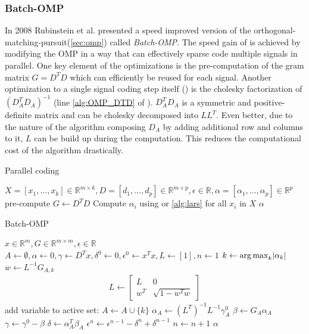 \subsubsection{Batch-OMP}
In 2008 Rubinstein et al.\cite{Rubinstein2008} presented a speed improved
version of the orthogonal-matching-pursuit(\ref{sec:omp}) called
\emph{Batch-OMP}. The speed gain of  is achieved
by modifying the OMP in a way that can effectively sparse code
multiple signals in parallel. One key element of the optimizations is the
pre-computation of the gram matrix $G=D^TD$ which can efficiently be reused
for each signal. Another optimization to a single signal coding step itself
() is the cholesky factorization of $\left( D_A^T D_A
\right)^{-1}$ (line \ref{alg:OMP_DTD} of ). $D_A^T
D_A$ is a symmetric and positive-definite matrix and can be cholesky decomposed
into $LL^T$. Even better, due to the nature of the algorithm composing $D_A$
by adding additional row and columns to it, $L$ can be build up during the
computation. This reduces the computational cost of the algorithm drastically.

\begin{algorithm}[H]
\caption{Parallel coding}
\label{alg:parallel}
\begin{algorithmic}[1]
\REQUIRE $X =[x_1,...,x_k]  \in \mathbb{R}^{m \times k}, D  =[d_1,...,d_p]  \in
\mathbb{R}^{m\times p}, \epsilon \in \mathbb{R}, \alpha =
[\alpha_1,...,\alpha_p] \in
\mathbb{R}^{p}$
\STATE pre-compute $G \gets D^TD$
\STATE Compute $\alpha_i$ using  or
\ref{alg:lars} for all ${x_i}$ in $X$
\ENDFOR
\RETURN $\alpha$
\end{algorithmic}
\end{algorithm}

\begin{algorithm}[H]
\caption{Batch-OMP}
\label{alg:batchOMP}
\begin{algorithmic}[1]
\REQUIRE $x \in \mathbb{R}^{m}, G  \in
\mathbb{R}^{m\times m}, \epsilon \in \mathbb{R}$
\STATE $A \gets \emptyset,\alpha \gets 0,\gamma \gets D^Tx,\delta^0 \gets
0, \epsilon^0\gets x^Tx,L\gets[1],n\gets1$
\STATE $k \gets \operatorname*{arg\,max}_k\lvert \alpha_k \rvert$
\STATE $w \gets L^{-1}G_{A,k}$
\STATE
\begin{align}
L \gets \left[
\begin{array}{ccc}
L & 0\\
w^T & \sqrt{1-w^Tw}
\end{array}
\right]
\end{align}
\ENDIF
\STATE add variable to active set: $A \gets A \cup \{ k\}$
\STATE $\alpha_A \gets (L^T)^{-1}L^{-1}\gamma_A^0$
\STATE $\beta \gets G_A\alpha_A$
\STATE $\gamma \gets \gamma^0-\beta$
\STATE $\delta \gets \alpha_A^T\beta_A$
\STATE $\epsilon^n \gets \epsilon^{n-1} - \delta^n + \delta^{n-1}$
\STATE $n \gets n+1$
\ENDWHILE
\RETURN $\alpha$
\end{algorithmic}
\end{algorithm}


